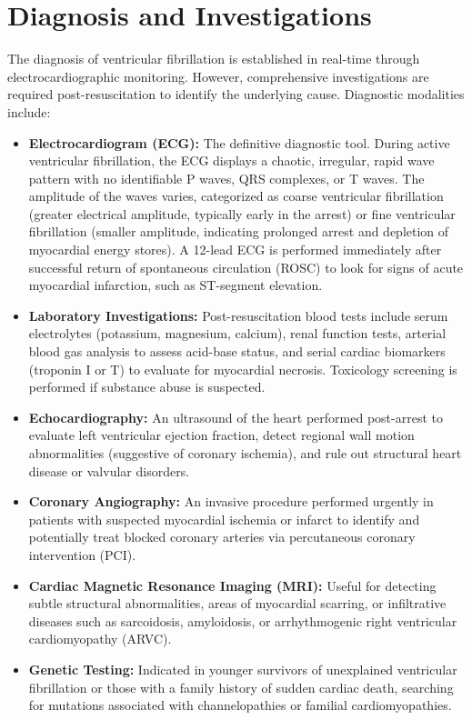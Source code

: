 \section*{Diagnosis and Investigations}
The diagnosis of ventricular fibrillation is established in real-time through electrocardiographic monitoring. However, comprehensive investigations are required post-resuscitation to identify the underlying cause.
Diagnostic modalities include:
\begin{itemize}
    \item \textbf{Electrocardiogram (ECG):} The definitive diagnostic tool. During active ventricular fibrillation, the ECG displays a chaotic, irregular, rapid wave pattern with no identifiable P waves, QRS complexes, or T waves. The amplitude of the waves varies, categorized as coarse ventricular fibrillation (greater electrical amplitude, typically early in the arrest) or fine ventricular fibrillation (smaller amplitude, indicating prolonged arrest and depletion of myocardial energy stores). A 12-lead ECG is performed immediately after successful return of spontaneous circulation (ROSC) to look for signs of acute myocardial infarction, such as ST-segment elevation.
    \item \textbf{Laboratory Investigations:} Post-resuscitation blood tests include serum electrolytes (potassium, magnesium, calcium), renal function tests, arterial blood gas analysis to assess acid-base status, and serial cardiac biomarkers (troponin I or T) to evaluate for myocardial necrosis. Toxicology screening is performed if substance abuse is suspected.
    \item \textbf{Echocardiography:} An ultrasound of the heart performed post-arrest to evaluate left ventricular ejection fraction, detect regional wall motion abnormalities (suggestive of coronary ischemia), and rule out structural heart disease or valvular disorders.
    \item \textbf{Coronary Angiography:} An invasive procedure performed urgently in patients with suspected myocardial ischemia or infarct to identify and potentially treat blocked coronary arteries via percutaneous coronary intervention (PCI).
    \item \textbf{Cardiac Magnetic Resonance Imaging (MRI):} Useful for detecting subtle structural abnormalities, areas of myocardial scarring, or infiltrative diseases such as sarcoidosis, amyloidosis, or arrhythmogenic right ventricular cardiomyopathy (ARVC).
    \item \textbf{Genetic Testing:} Indicated in younger survivors of unexplained ventricular fibrillation or those with a family history of sudden cardiac death, searching for mutations associated with channelopathies or familial cardiomyopathies.
\end{itemize}

